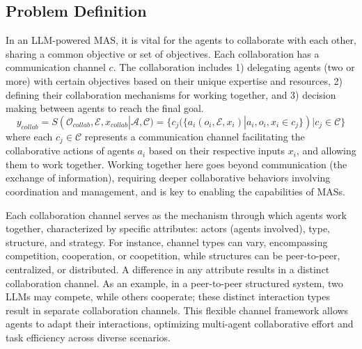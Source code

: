 \documentclass[acmsmall,nonacm]{acmart}
\begin{document}
    \subsection{Problem Definition}
        In an LLM-powered MAS, it is vital for the agents to collaborate with each other, sharing a common objective or set of objectives. Each collaboration has a communication channel $c$. The collaboration includes 1) delegating agents (two or more) with certain objectives based on their unique expertise and resources, 2) defining their collaboration mechanisms for working together, and 3) decision making between agents to reach the final goal.
        \begin{equation}
            y_{collab}=S(\mathcal{O}_{collab},\mathcal{E},x_{collab}|\mathcal{A},\mathcal{C})=\{c_j(\{a_{i} (o_i, \mathcal{E}, x_i) | a_{i}, o_i, x_{i} \in c_j \}) | c_j\in \mathcal{C}\}
        \end{equation}
        where each $c_j \in \mathcal{C}$ 
        represents a communication channel facilitating the collaborative actions of agents $a_{i}$ 
        based on their respective inputs $x_{i}$, and allowing them to work together. Working together here goes beyond communication (the exchange of information), requiring deeper collaborative behaviors involving coordination and management, and is key to enabling the capabilities of MASs.

        Each collaboration channel serves as the mechanism through which agents work together, characterized by specific attributes: actors (agents involved), type, structure, and strategy. For instance, channel types can vary, encompassing competition, cooperation, or coopetition, while structures can be peer-to-peer, centralized, or distributed. A difference in any attribute results in a distinct collaboration channel. As an example, in a peer-to-peer structured system, two LLMs may compete, while others cooperate; these distinct interaction types result in separate collaboration channels. This flexible channel framework allows agents to adapt their interactions, optimizing multi-agent collaborative effort and task efficiency across diverse scenarios.
\end{document}
